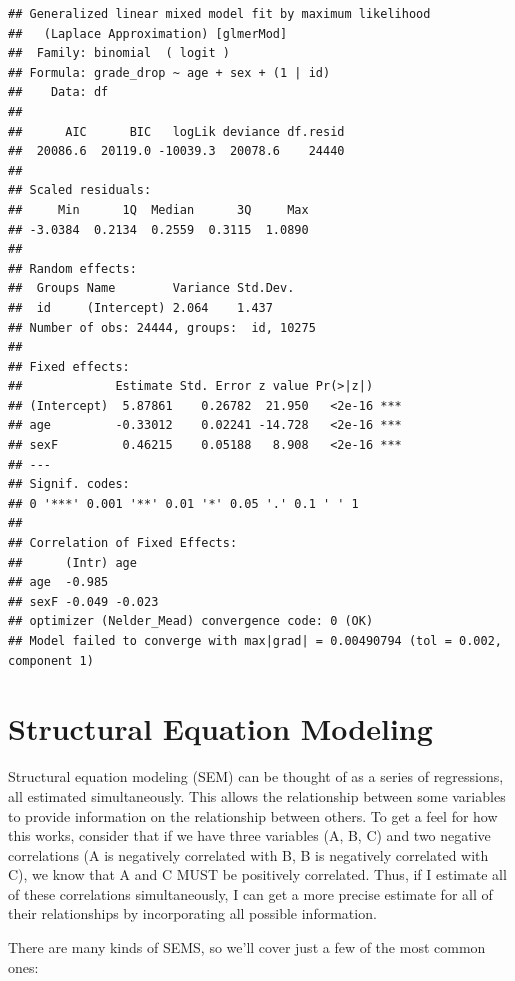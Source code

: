 \documentclass[
]{book}
\begin{document}
\begin{verbatim}
## Generalized linear mixed model fit by maximum likelihood
##   (Laplace Approximation) [glmerMod]
##  Family: binomial  ( logit )
## Formula: grade_drop ~ age + sex + (1 | id)
##    Data: df
## 
##      AIC      BIC   logLik deviance df.resid 
##  20086.6  20119.0 -10039.3  20078.6    24440 
## 
## Scaled residuals: 
##     Min      1Q  Median      3Q     Max 
## -3.0384  0.2134  0.2559  0.3115  1.0890 
## 
## Random effects:
##  Groups Name        Variance Std.Dev.
##  id     (Intercept) 2.064    1.437   
## Number of obs: 24444, groups:  id, 10275
## 
## Fixed effects:
##             Estimate Std. Error z value Pr(>|z|)    
## (Intercept)  5.87861    0.26782  21.950   <2e-16 ***
## age         -0.33012    0.02241 -14.728   <2e-16 ***
## sexF         0.46215    0.05188   8.908   <2e-16 ***
## ---
## Signif. codes:  
## 0 '***' 0.001 '**' 0.01 '*' 0.05 '.' 0.1 ' ' 1
## 
## Correlation of Fixed Effects:
##      (Intr) age   
## age  -0.985       
## sexF -0.049 -0.023
## optimizer (Nelder_Mead) convergence code: 0 (OK)
## Model failed to converge with max|grad| = 0.00490794 (tol = 0.002, component 1)
\end{verbatim}

\hypertarget{structural-equation-modeling}{%
\chapter{Structural Equation Modeling}\label{structural-equation-modeling}}

Structural equation modeling (SEM) can be thought of as a series of regressions, all estimated simultaneously. This allows the relationship between some variables to provide information on the relationship between others. To get a feel for how this works, consider that if we have three variables (A, B, C) and two negative correlations (A is negatively correlated with B, B is negatively correlated with C), we know that A and C MUST be positively correlated. Thus, if I estimate all of these correlations simultaneously, I can get a more precise estimate for all of their relationships by incorporating all possible information.

There are many kinds of SEMS, so we'll cover just a few of the most common ones:
\end{document}
